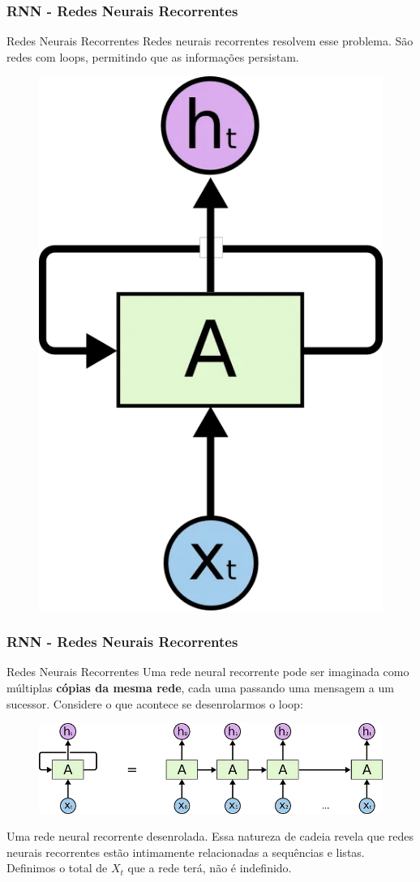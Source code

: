 \documentclass{beamer}
\begin{document}
\begin{frame}
	\frametitle{RNN - Redes Neurais Recorrentes}
	\begin{block}{Redes Neurais Recorrentes}
		Redes neurais recorrentes resolvem esse problema. São redes com loops, permitindo que as informações persistam.
	\begin{figure}
		\centering
		\includegraphics[width=0.3\linewidth]{figures/rnn_neuron}
	\end{figure}
		
	\end{block}
\end{frame}
\begin{frame}
	\frametitle{RNN - Redes Neurais Recorrentes}
	\begin{block}{Redes Neurais Recorrentes}
		Uma rede neural recorrente pode ser imaginada como múltiplas \textbf{cópias da mesma rede}, cada uma passando uma mensagem a um sucessor. Considere o que acontece se desenrolarmos o loop:
		\begin{figure}
			\centering
			\includegraphics[width=0.7\linewidth]{figures/rnn_neuron_loop}
		\end{figure}
	Uma rede neural recorrente desenrolada. Essa natureza de cadeia revela que redes neurais recorrentes estão intimamente relacionadas a sequências e listas. \\
	Definimos o total de $X_t$ que a rede terá, não é indefinido.
	\end{block}
\end{frame}
\end{document}
